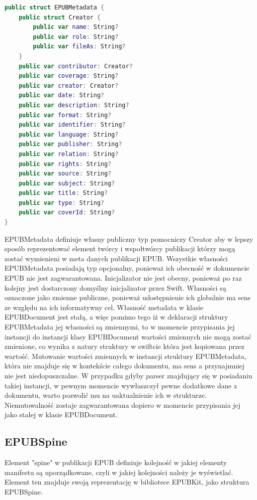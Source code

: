 \begin{lstlisting}[caption={Struktura EPUBMetadata.}, language=swift]
public struct EPUBMetadata {
    public struct Creator {
        public var name: String?
        public var role: String?
        public var fileAs: String?
    }
    public var contributor: Creator?
    public var coverage: String?
    public var creator: Creator?
    public var date: String?
    public var description: String?
    public var format: String?
    public var identifier: String?
    public var language: String?
    public var publisher: String?
    public var relation: String?
    public var rights: String?
    public var source: String?
    public var subject: String?
    public var title: String?
    public var type: String?
    public var coverId: String?
}
\end{lstlisting}

EPUBMetadata definiuje własny publiczny typ pomocniczy Creator aby w lepszy sposób reprezentować element twórcy i wspołtwórcy publikacji którzy mogą zostać wymienieni w meta danych publikacji EPUB. Wszystkie własności EPUBMetadata posiadają typ opcjonalny, ponieważ ich obecność w dokumencie EPUB nie jest zagwarantowana. Inicjalizator nie jest obecny, ponieważ po raz kolejny jest dostarczony domyślny inicjalizator przez Swift. Własności są oznaczone jako zmienne publiczne, ponieważ udostępnienie ich globalnie ma sens ze względu na ich informatywny cel. Własność metadata w klasie EPUBDocument jest stałą, a więc pomimo tego iż w deklaracji struktury EPUBMetadata jej własności są zmiennymi, to w momencie przypisania jej instancji do instancji klasy EPUBDocument wartości zmiennych nie mogą zostać zmienione, co wynika z natury struktury w swiftcie która jest kopiowana przez wartość. Mutowanie wartości zmiennych w instancji struktury EPUBMetadata, która nie znajduje się w kontekście całego dokumentu, ma sens a przynajmniej nie jest niedopuszczalne. W przypadku gdyby parser znajdujący się w posiadaniu takiej instancji, w pewnym momencie wywłaszczył pewne dodatkowe dane z dokumentu, warto pozwolić mu na uaktualnienie ich w strukturze. Niemutowalność zostaje zagwarantowana dopiero w momencie przypisania jej jako stałej w klasie EPUBDocument.

\subsection{EPUBSpine}

Element "spine" w publikacji EPUB definiuje kolejność w jakiej elementy manifestu są uporządkowane, czyli w jakiej kolejności należy je wyświetlać. Element ten znajduje swoją reprezentację w bibliotece EPUBKit, jako struktura EPUBSpine.

